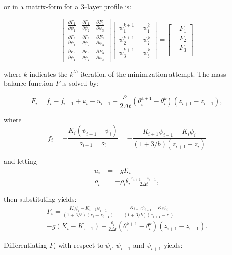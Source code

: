 \documentclass[10pt, letterpapr]{article}
\begin{document}
\noindent or in a matrix-form for a $3$--layer profile is:

\[
	\begin{bmatrix}
		\frac{\partial F_1}{\partial\psi_1} & \frac{\partial F_1}{\partial\psi_2} & \frac{\partial F_1}{\partial\psi_3} \\
		\frac{\partial F_2}{\partial\psi_1} & \frac{\partial F_2}{\partial\psi_2} & \frac{\partial F_2}{\partial\psi_3} \\
		\frac{\partial F_3}{\partial\psi_1} & \frac{\partial F_3}{\partial\psi_2} & \frac{\partial F_3}{\partial\psi_3}
	\end{bmatrix}
	\begin{bmatrix}
		\psi_1^{k+1}-\psi_1^k \\
		\psi_2^{k+1}-\psi_2^k \\
		\psi_3^{k+1}-\psi_3^k
	\end{bmatrix}
	=
	\begin{bmatrix}
		-F_1 \\
		-F_2 \\
		-F_3 \\
	\end{bmatrix}	
\]

\noindent where $k$ indicates the $k^{th}$ iteration of the minimization attempt. The mass-balance function $F$ is solved by:

\[
	F_i=f_i-f_{i-1}+u_i-u_{i-1}-\frac{\rho_l}{2\Delta t}\left(\theta_i^{k+1}-\theta_i^k\right)\left(z_{i+1}-z_{i-1}\right),
\]

\noindent where
\[
	f_i=-\frac{\overline{K}_i\left(\psi_{i+1}-\psi_i\right)}{z_{i+1}-z_i} = -\frac{K_{i+1}\psi_{i+1}-K_i\psi_i}{\left(1+3/b\right)\left(z_{i+1}-z_i\right)}	
\]

\noindent and letting
\begin{align*}
	u_i &=-gK_i \\
	\varrho_i &=-\rho_l\theta_i\frac{z_{i+1}-z_{i-1}}{2\Delta t},
\end{align*}

\noindent then substituting yields:
\begin{multline*}
	F_i=\frac{K_i\psi_i-K_{i-1}\psi_{i-1}}{\left(1+3/b\right)\left(z_i-z_{i-1}\right)}
	-\frac{K_{i+1}\psi_{i+1}-K_i\psi_i}{\left(1+3/b\right)\left(z_{i+1}-z_i\right)} \\
	-g\left(K_i-K_{i-1}\right)-
	\frac{\rho_l}{2\Delta t}\left(\theta_i^{k+1}-\theta_i^k\right)\left(z_{i+1}-z_{i-1}\right).
\end{multline*}

\noindent Differentiating $F_i$ with respect to $\psi_i$, $\psi_{i-1}$ and $\psi_{i+1}$ yields:
\end{document}

